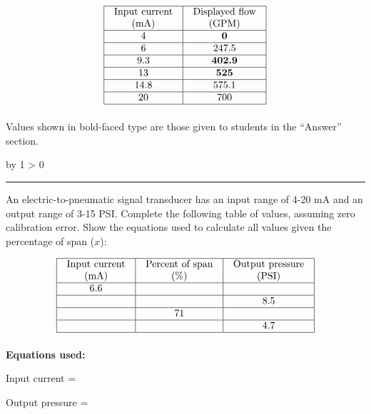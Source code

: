 \documentclass[12pt,a4paper]{article}
\def\oppgave{
            \advance\questnum by 1
            \ifnum \questnum > 0
                 \hrule
                 \vskip 3pt
                 \leftline{Oppgave \the\questnum}
                 \vskip 3pt \fi}
\begin{document}
$$\vbox{\offinterlineskip
\halign{\strut
\vrule \quad\hfil # \ \hfil & 
\vrule \quad\hfil # \ \hfil \vrule \cr
\noalign{\hrule}
%
Input current & Displayed flow \cr
(mA) & (GPM) \cr
%
\noalign{\hrule}
%
4 & {\bf 0} \cr
%
\noalign{\hrule}
%
6 & 247.5 \cr
%
\noalign{\hrule}
%
9.3 & {\bf 402.9} \cr
%
\noalign{\hrule}
%
13 & {\bf 525} \cr
%
\noalign{\hrule}
%
14.8 & 575.1 \cr
%
\noalign{\hrule}
%
20 & 700 \cr
%
\noalign{\hrule}
} %
}$$ %

Values shown in bold-faced type are those given to students in the ``Answer'' section.



\vfil \eject 



\oppgave{} 

An electric-to-pneumatic signal transducer has an input range of 4-20 mA and an output range of 3-15 PSI.  Complete the following table of values, assuming zero calibration error.  Show the equations used to calculate all values given the percentage of span ($x$):


$$\vbox{\offinterlineskip
\halign{\strut
\vrule \quad\hfil # \ \hfil & 
\vrule \quad\hfil # \ \hfil & 
\vrule \quad\hfil # \ \hfil \vrule \cr
\noalign{\hrule}
%
Input current & Percent of span & Output pressure \cr
%
(mA) & (\%) & (PSI) \cr
%
\noalign{\hrule}
%
6.6 &  &  \cr
%
\noalign{\hrule}
%
 &  & 8.5 \cr
%
\noalign{\hrule}
%
 & 71 &  \cr
%
\noalign{\hrule}
%
 &  & 4.7 \cr
%
\noalign{\hrule}
} %
}$$ %

\vskip 10pt

\noindent
{\bf Equations used:}

\vskip 20pt

Input current = 

\vskip 20pt

Output pressure = 
\end{document}
